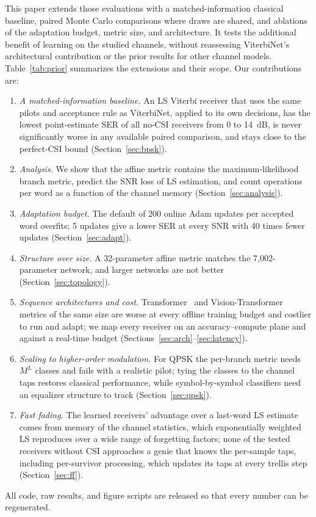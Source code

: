 \documentclass[journal]{IEEEtran}
\begin{document}
This paper extends those evaluations with a matched-information classical baseline, paired Monte Carlo comparisons where draws are shared, and ablations of the adaptation budget, metric size, and architecture. It tests the additional benefit of learning on the studied channels, without reassessing ViterbiNet's architectural contribution or the prior results for other channel models. Table~\ref{tab:prior} summarizes the extensions and their scope. Our contributions are:
\begin{enumerate}
\item \emph{A matched-information baseline.} An LS Viterbi receiver that uses the same pilots and acceptance rule as ViterbiNet, applied to its own decisions, has the lowest point-estimate SER of all no-CSI receivers from 0 to 14~dB, is never significantly worse in any available paired comparison, and stays close to the perfect-CSI bound (Section~\ref{sec:bpsk}).
\item \emph{Analysis.} We show that the affine metric contains the maximum-likelihood branch metric, predict the SNR loss of LS estimation, and count operations per word as a function of the channel memory (Section~\ref{sec:analysis}).
\item \emph{Adaptation budget.} The default of 200 online Adam updates per accepted word overfits; 5 updates give a lower SER at every SNR with 40 times fewer updates (Section~\ref{sec:adapt}).
\item \emph{Structure over size.} A 32-parameter affine metric matches the 7,002-parameter network, and larger networks are not better (Section~\ref{sec:topology}).
\item \emph{Sequence architectures and cost.} Transformer~\cite{vaswani2017attention} and Vision-Transformer~\cite{dosovitskiy2021vit} metrics of the same size are worse at every offline training budget and costlier to run and adapt; we map every receiver on an accuracy--compute plane and against a real-time budget (Sections~\ref{sec:arch}--\ref{sec:latency}).
\item \emph{Scaling to higher-order modulation.} For QPSK the per-branch metric needs $M^L$ classes and fails with a realistic pilot; tying the classes to the channel taps restores classical performance, while symbol-by-symbol classifiers need an equalizer structure to track (Section~\ref{sec:qpsk}).
\item \emph{Fast fading.} The learned receivers' advantage over a last-word LS estimate comes from memory of the channel statistics, which exponentially weighted LS reproduces over a wide range of forgetting factors; none of the tested receivers without CSI approaches a genie that knows the per-sample taps, including per-survivor processing, which updates its taps at every trellis step (Section~\ref{sec:ff}).
\end{enumerate}
All code, raw results, and figure scripts are released so that every number can be regenerated.
\end{document}
